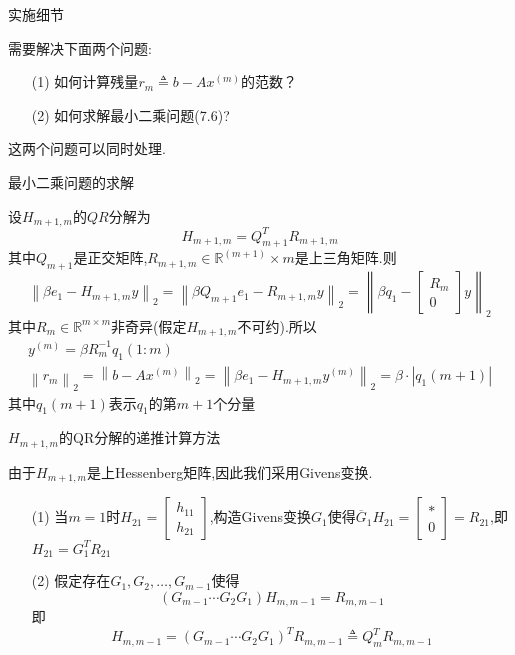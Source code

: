\documentclass[notheorems,serif]{beamer}
\renewcommand{\normalsize}{\wuhao}
\newcommand{\wuhao}{\fontsize{10.5pt}{\baselineskip}\selectfont}
\begin{document}
\begin{frame}


{\color{blue}\Large 实施细节}

\quad

\normalsize
需要解决下面两个问题:

\begin{itemize}
	\item[(1)] 如何计算残量$r_{m} \triangleq b-A x^{(m)}$的范数？
	\item[(2)] 如何求解最小二乘问题(7.6)?
\end{itemize}
{\color{blue}这两个问题可以同时处理.}\\
\end{frame}

\begin{frame}


{\color{blue}\Large 最小二乘问题的求解}

\quad

\normalsize
设$H_{m+1, m}$的$QR$分解为
$$
H_{m+1, m}=Q_{m+1}^{T} R_{m+1, m}
$$
其中$Q_{m+1}$是正交矩阵,$R_{m+1, m} \in \mathbb{R}^{(m+1)} \times m$是上三角矩阵.则
$$
\left\|\beta e_{1}-H_{m+1, m} y\right\|_{2}=\left\|\beta Q_{m+1} e_{1}-R_{m+1, m} y\right\|_{2}=\left\|\beta q_{1}-\left[\begin{array}{c}{R_{m}} \\ {0}\end{array}\right] y\right\|_{2}
$$
其中$R_{m} \in \mathbb{R}^{m \times m}$非奇异(假定$H_{m+1, m}$不可约).所以
$$
\begin{array}{l}{y^{(m)}=\beta R_{m}^{-1} q_{1}(1 : m)} \\ {\left\|r_{m}\right\|_{2}=\left\|b-A x^{(m)}\right\|_{2}=\left\|\beta e_{1}-H_{m+1, m} y^{(m)}\right\|_{2}=\beta \cdot\left|q_{1}(m+1)\right|}\end{array}
$$
其中$q_{1}(m+1)$表示$q_1$的第$m+ 1$个分量
\end{frame}

\begin{frame}


{\color{blue}\Large $H_{m+1, m}$的QR分解的递推计算方法}

\quad

\normalsize
由于$H_{m+1, m}$是上Hessenberg矩阵,因此我们采用Givens变换.\\
\begin{itemize}
\item[(1)] 当$m=1$时$H_{21}=\left[\begin{array}{l}{h_{11}} \\ {h_{21}}\end{array}\right]$,构造Givens变换$G_1$使得$\overline{G}_{1} H_{21}=\left[\begin{array}{l}{*} \\ {0}\end{array}\right]=R_{21}$,即$H_{21}=G_{1}^{T} R_{21}$
	\item[(2)] 假定存在$G_{1}, G_{2}, \ldots, G_{m-1}$使得
	$$
	\left(G_{m-1} \cdots G_{2} G_{1}\right) H_{m, m-1}=R_{m, m-1}
	$$
	即
	$$
	H_{m, m-1}=\left(G_{m-1} \cdots G_{2} G_{1}\right)^{T} R_{m, m-1} \triangleq Q_{m}^{T} R_{m, m-1}
	$$
\end{itemize}
\end{frame}
	
\end{document}
